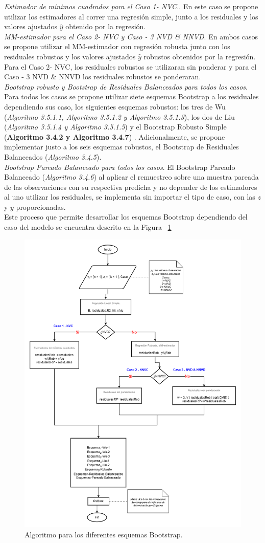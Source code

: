 \textit{Estimador de mínimos cuadrados para el Caso 1- NVC.}. En este caso se propone utilizar los estimadores al correr una regresión simple, junto a los residuales y los valores ajustados $\hat{y}$ obtenido por la regresión.\\


\textit{MM-estimador para el Caso 2- NVC y  Caso - 3 NVD \& NNVD}. En ambos casos se propone utilizar el MM-estimador con regresión robusta junto con los residuales robustos y los valores ajustados $\hat{y}$ robustos obtenidos por la regresión. Para el Caso 2- NVC, los residuales robustos se utilizaran sin ponderar y para el  Caso - 3 NVD \& NNVD los residuales robustos se ponderaran.  \\



\textit{Bootstrap robusto y Bootstrap de Residuales Balanceados para todos los casos}. Para todos los casos se propone utilizar siete esquemas Bootstrap a los residuales dependiendo sus caso, los siguientes esquemas robustos: los tres de Wu (\textit{Algoritmo 3.5.1.1, Algoritmo 3.5.1.2 y Algoritmo 3.5.1.3}), los dos de Liu (\textit{Algoritmo 3.5.1.4 y Algoritmo 3.5.1.5}) y el Bootstrap Robusto Simple (\textbf{Algoritmo 3.4.2 y Algoritmo 3.4.7}) . Adicionalmente, se propone implementar justo a los seis esquemas robustos, el Bootstrap de Residuales Balanceados (\textit{Algoritmo 3.4.5}). \\


\textit{Bootstrap Pareado Balanceado para todos los casos}. El Bootstrap Pareado Balanceado (\textit{Algoritmo 3.4.6}) al aplicar el remuestreo sobre una muestra pareada de las observaciones con su respectiva predicha y no depender de los estimadores al uno utilizar los residuales, se implementa sin importar el tipo de caso, con las $z$ y $y$ proporcionadas.\\

Este proceso que permite desarrollar los esquemas Bootstrap dependiendo del caso del modelo se encuentra descrito en la Figura ~\ref{fig:AlgDifEsqBoots}

 

\begin{figure}[ht!]
	\centering 
	\includegraphics[width=0.4\linewidth]{img/metodologia_v4.png} 
	\caption{Algoritmo para los diferentes esquemas Bootstrap.}
	\label{fig:AlgDifEsqBoots}
\end{figure}
\FloatBarrier


